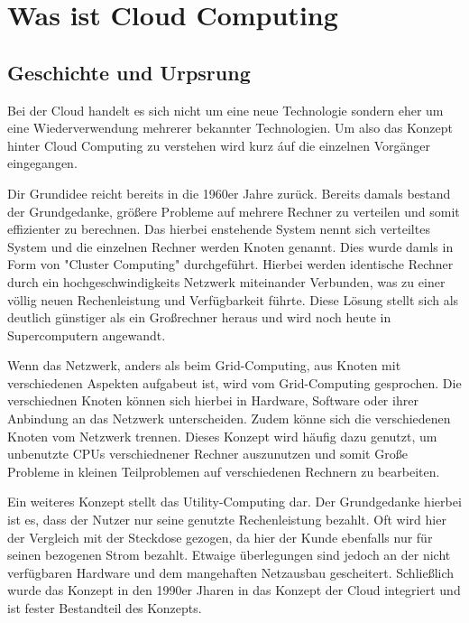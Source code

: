 \chapter{Was ist \Gls{Cloud Computing}}\label{ch:2}
\section{Geschichte und Urpsrung}
Bei der Cloud handelt es sich nicht um eine neue Technologie sondern eher um eine Wiederverwendung mehrerer bekannter Technologien. Um also das Konzept hinter Cloud Computing zu verstehen wird kurz áuf die einzelnen Vorgänger eingegangen.

Dir Grundidee reicht bereits in die 1960er Jahre zurück. Bereits damals bestand der Grundgedanke, größere Probleme auf mehrere Rechner zu verteilen und somit effizienter zu berechnen. Das hierbei enstehende System nennt sich verteiltes System und die einzelnen Rechner werden Knoten genannt. Dies wurde damls in Form von "Cluster Computing" durchgeführt. Hierbei werden identische Rechner durch ein hochgeschwindigkeits Netzwerk miteinander Verbunden, was zu einer völlig neuen Rechenleistung und Verfügbarkeit führte. Diese Lösung stellt sich als deutlich günstiger als ein Großrechner heraus und wird noch heute in Supercomputern angewandt.

Wenn das Netzwerk, anders als beim Grid-Computing, aus Knoten mit verschiedenen Aspekten aufgabeut ist, wird vom Grid-Computing gesprochen. Die verschiednen Knoten können sich hierbei in Hardware, Software oder ihrer Anbindung an das Netzwerk unterscheiden. Zudem könne sich die verschiedenen Knoten vom Netzwerk trennen. Dieses Konzept wird häufig dazu genutzt, um unbenutzte CPUs verschiednener Rechner auszunutzen und somit Große Probleme in kleinen Teilproblemen auf verschiedenen Rechnern zu bearbeiten.

Ein weiteres Konzept stellt das Utility-Computing dar. Der Grundgedanke hierbei ist es, dass der Nutzer nur seine genutzte Rechenleistung bezahlt. Oft wird hier der Vergleich mit der Steckdose gezogen, da hier der Kunde ebenfalls nur für seinen bezogenen Strom bezahlt\cite*[]{TUB}. Etwaige überlegungen sind jedoch an der nicht verfügbaren Hardware und dem mangehaften Netzausbau gescheitert. Schließlich wurde das Konzept in den 1990er Jharen in das Konzept der Cloud integriert und ist fester Bestandteil des Konzepts.


